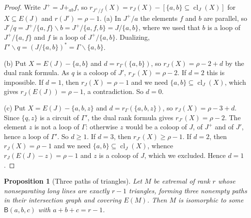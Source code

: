 \documentclass[11pt]{amsart}
\newtheorem{proposition}[theorem]{Proposition}
\theoremstyle{definition}
\theoremstyle{remark}
\numberwithin{equation}{section}
\newcommand{\cl}{\operatorname{cl}}
\newcommand{\FB}{\mathsf{B}}
\begin{document}
\begin{proof}
Write $J^+=J+_{ab}f$, so $r_{J^+/f}(X)=r_J(X)-[\{a,b\}\subseteq\cl_J(X)]$ for $X\subseteq E(J)$ and $r(J')=\rho-1$. (a) In $J^+/a$ the elements $f$ and $b$ are parallel, so $J'/q=J^+/\{a,f\}\backslash b=J^+/\{a,f,b\}=J/\{a,b\}$, where we used that $b$ is a loop of $J^+/\{a,f\}$ and $f$ is a loop of $J^+/\{a,b\}$. Dualizing, $\Gamma'\backslash q=(J/\{a,b\})^*=\Gamma\backslash\{a,b\}$.

(b) Put $X=E(J)-\{a,b\}$ and $d=r_\Gamma(\{a,b\})$, so $r_J(X)=\rho-2+d$ by the dual rank formula. As $q$ is a coloop of $J'$, $r_{J'}(X)=\rho-2$. If $d=2$ this is impossible. If $d=1$, then $r_J(X)=\rho-1$ and we need $\{a,b\}\subseteq\cl_J(X)$, which gives $r_J(E(J))=\rho-1$, a contradiction. So $d=0$.

(c) Put $X=E(J)-\{a,b,z\}$ and $d=r_\Gamma(\{a,b,z\})$, so $r_J(X)=\rho-3+d$. Since $\{q,z\}$ is a circuit of $\Gamma'$, the dual rank formula gives $r_{J'}(X)=\rho-2$. The element $z$ is not a loop of $\Gamma$: otherwise $z$ would be a coloop of $J$, of $J^+$ and of $J'$, hence a loop of $\Gamma'$. So $d\ge1$. If $d=3$, then $r_{J'}(X)\ge\rho-1$. If $d=2$, then $r_J(X)=\rho-1$ and we need $\{a,b\}\subseteq\cl_J(X)$, whence $r_J(E(J)-z)=\rho-1$ and $z$ is a coloop of $J$, which we excluded. Hence $d=1$.
\end{proof}

\begin{proposition}[Three paths of triangles]\label{prop:threepaths}
Let $M$ be extremal of rank $r$ whose nonseparating long lines are exactly $r-1$ triangles, forming three nonempty paths in their intersection graph and covering $E(M)$. Then $M$ is isomorphic to some $\FB(a,b,c)$ with $a+b+c=r-1$.
\end{proposition}
\end{document}
